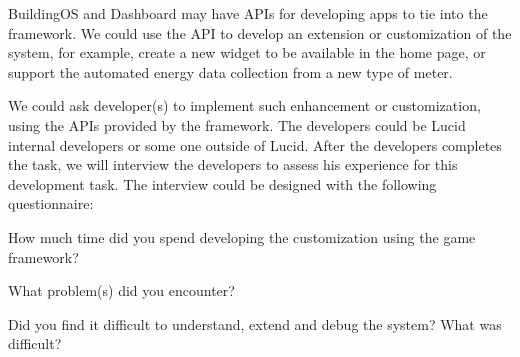 BuildingOS and Dashboard may have APIs for developing apps to tie into the framework. We could use the API to develop an extension or customization of the system, for example, create a new widget to be available in the home page, or support the automated energy data collection from a new type of meter.

We could ask developer(s) to implement such enhancement or customization, using the APIs provided by the framework. The developers could be Lucid internal developers or some one outside of Lucid. After the developers completes the task, we will interview the developers to assess his experience for this development task. The interview could be designed with the following questionnaire:

\begin{compactitem}
\item How much time did you spend developing the customization using the game framework?
\item What problem(s) did you encounter?
\item Did you find it difficult to understand, extend and debug the system? What was difficult?\\
\end{compactitem}    